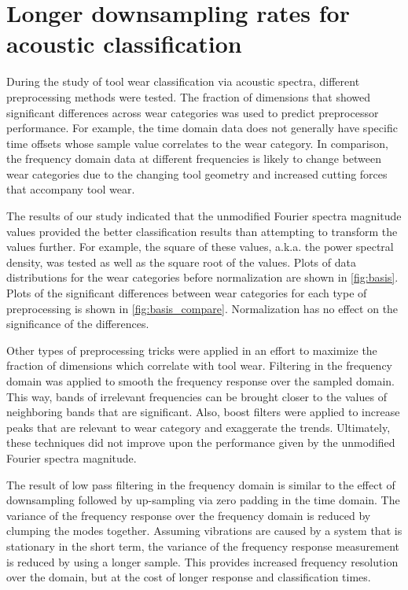 \chapter{Longer downsampling rates for acoustic classification
\label{chap:9}}

During the study of tool wear classification via acoustic spectra, 
different preprocessing methods were tested. 
The fraction of dimensions that showed significant differences 
across wear categories was used to predict preprocessor performance.
For example, the time domain data does not generally have specific 
time offsets whose sample value correlates to the wear category.
In comparison, the frequency domain data at different frequencies
is likely to change between wear categories due to the changing tool geometry
and increased cutting forces that accompany tool wear.

The results of our study indicated that the unmodified Fourier spectra magnitude values
provided the better classification results than attempting to transform the values further.
For example, the square of these values, a.k.a. the power spectral density, 
was tested as well as the square root of the values.
Plots of data distributions for the wear categories before normalization are shown in \ref{fig:basis}.
Plots of the significant differences between wear categories for each type of preprocessing 
is shown in \ref{fig:basis_compare}. Normalization has no effect on the significance of the differences.

Other types of preprocessing tricks were applied in an effort 
to maximize the fraction of dimensions which correlate with tool wear.
Filtering in the frequency domain was applied to  smooth 
the frequency response over the sampled domain.
This way, bands of irrelevant frequencies can be brought closer to the
values of neighboring bands that are significant. 
Also, boost filters were applied to increase peaks that are
relevant to wear category and exaggerate the trends.
Ultimately, these techniques did not improve upon the performance
given by the unmodified Fourier spectra magnitude.

The result of low pass filtering in the frequency domain is similar
to the effect of downsampling followed by up-sampling 
via zero padding in the time domain. 
The variance of the 
frequency response over the frequency domain is reduced by clumping
the modes together.
Assuming vibrations are caused by a system that is 
stationary in the short term, the variance of the frequency 
response measurement is reduced by using a longer sample.
This provides increased frequency resolution over the domain,
but at the cost of longer response and classification times.

